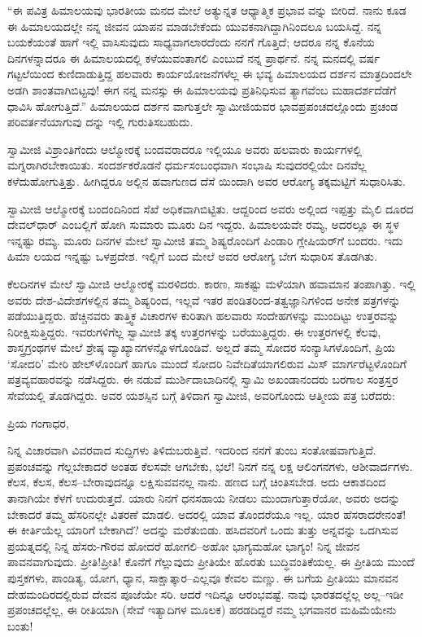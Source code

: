 “ಈ ಪವಿತ್ರ ಹಿಮಾಲಯವು ಭಾರತೀಯ ಮನದ ಮೇಲೆ ಅತ್ಯುನ್ನತ ಆಧ್ಯಾತ್ಮಿಕ ಪ್ರಭಾವ ವನ್ನು ಬೀರಿದೆ. ನಾನು ಕೂಡ ಈ ಹಿಮಾಲಯದಲ್ಲೇ ನನ್ನ ಜೀವನ ಯಾಪನ ಮಾಡಬೇಕೆಂದು ಯುವಕನಾಗಿದ್ದಾಗಿನಿಂದಲೂ ಬಯಸಿದ್ದೆ. ನನ್ನ ಬಯಕೆಯಂತೆ ಹಾಗೆ ಇಲ್ಲಿ ವಾಸಿಸುವುದು ಸಾಧ್ಯವಾಗಲಾರದೆಂದು ನನಗೆ ಗೊತ್ತಿದೆ; ಆದರೂ ನನ್ನ ಕೊನೆಯ ದಿನಗಳನ್ನಾದರೂ ಈ ಹಿಮಾಲಯದಲ್ಲಿ ಕಳೆಯುವಂತಾಗಲಿ ಎಂಬುದೆ ನನ್ನ ಪ್ರಾರ್ಥನೆ. ನನ್ನ ಮನದಲ್ಲಿ ವರ್ಷ ಗಟ್ಟಲೆಯಿಂದ ಕುಣಿದಾಡುತ್ತಿದ್ದ ಹಲವಾರು ಕಾರ್ಯಯೋಜನೆಗಳೆಲ್ಲ ಈ ಭವ್ಯ ಹಿಮಾಲಯದ ದರ್ಶನ ಮಾತ್ರದಿಂದಲೇ ಅಡಗಿ ಶಾಂತವಾಗಿಬಿಟ್ಟವು! ಈಗ ನನ್ನ ಮನಸ್ಸು ಈ ಹಿಮಾಲಯವು ಪ್ರತಿನಿಧಿಸುವ ತ್ಯಾಗವೆಂಬ ಮಹಾದರ್ಶದೆಡೆಗೆ ಧಾವಿಸಿ ಹೋಗುತ್ತಿದೆ.” ಹಿಮಾಲಯದ ದರ್ಶನ ವಾಗುತ್ತಲೇ ಸ್ವಾಮೀಜಿಯವರ ಭಾವಪ್ರಪಂಚದಲ್ಲೊಂದು ಪ್ರಚಂಡ ಪರಿವರ್ತನೆಯಾಗುವು ದನ್ನು ಇಲ್ಲಿ ಗುರುತಿಸಬಹುದು.

ಸ್ವಾಮೀಜಿ ವಿಶ್ರಾಂತಿಗೆಂದು ಆಲ್ಮೋರಕ್ಕೆ ಬಂದವರಾದರೂ ಇಲ್ಲಿಯೂ ಅವರು ಹಲವಾರು ಕಾರ್ಯಗಳಲ್ಲಿ ಮಗ್ನರಾಗಿರಬೇಕಾಯಿತು. ಸಂದರ್ಶಕರೊಡನೆ ಧರ್ಮಸಂಬಂಧವಾಗಿ ಸಂಭಾಷಿ ಸುವುದರಲ್ಲಿಯೇ ದಿನವೆಲ್ಲ ಕಳೆದುಹೋಗುತ್ತಿತ್ತು. ಹೀಗಿದ್ದರೂ ಅಲ್ಲಿನ ಹವಾಗುಣದ ದೆಸೆ ಯಿಂದಾಗಿ ಅವರ ಆರೋಗ್ಯ ತಕ್ಕಮಟ್ಟಿಗೆ ಸುಧಾರಿಸಿತು.

ಸ್ವಾಮೀಜಿ ಆಲ್ಮೋರಕ್ಕೆ ಬಂದಂದಿನಿಂದ ಸೆಖೆ ಅಧಿಕವಾಗಿಬಿಟ್ಟಿತು. ಆದ್ದರಿಂದ ಅವರು ಅಲ್ಲಿಂದ ಇಪ್ಪತ್ತು ಮೈಲಿ ದೂರದ ದೇವಲ್​ಧಾರ್ ಎಂಬಲ್ಲಿಗೆ ಹೋಗಿ ಸುಮಾರು ಮೂರು ದಿನ ಇದ್ದರು. ಹಿಮಾಲಯವೇ ರಮ್ಯ, ಅದರಲ್ಲೂ ಈ ಸ್ಥಳ ಇನ್ನಷ್ಟು ರಮ್ಯ. ಮೂರು ದಿನಗಳ ಮೇಲೆ ಸ್ವಾಮೀಜಿ ತಮ್ಮ ಶಿಷ್ಯರೊಂದಿಗೆ ಪಿಂಡಾರಿ ಗ್ಲೇಷಿಯರ್​ಗೆ ಬಂದರು. ಇದು ಹಿಮಾ ಲಯದ ಇನ್ನಷ್ಟು ಒಳಪ್ರದೇಶ. ಇಲ್ಲಿಗೆ ಬಂದ ಮೇಲೆ ಅವರ ಆರೋಗ್ಯ ಬೇಗ ಸುಧಾರಿಸ ತೊಡಗಿತು.

ಕೆಲದಿನಗಳ ಮೇಲೆ ಸ್ವಾಮೀಜಿ ಆಲ್ಮೋರಕ್ಕೆ ಮರಳಿದರು. ಕಾರಣ, ಸಾಕಷ್ಟು ಮಳೆಯಾಗಿ ಹವಾಮಾನ ತಂಪಾಗಿತ್ತು. ಇಲ್ಲಿ ಅವರು ದೇಶ-ವಿದೇಶಗಳಲ್ಲಿನ ತಮ್ಮ ಶಿಷ್ಯರಿಂದ, ಇಲ್ಲವೆ ಇತರ ಪಂಡಿತರಿಂದ-ತತ್ವಜ್ಞಾನಿಗಳಿಂದ ಅನೇಕ ಪತ್ರಗಳನ್ನು ಪಡೆಯುತ್ತಿದ್ದರು. ಹೆಚ್ಚಿನವರು ತಾತ್ತ್ವಿಕ ವಿಚಾರಗಳ ಕುರಿತಾಗಿ ಹಲವಾರು ಸಂದೇಹಗಳನ್ನು ಮುಂದಿಟ್ಟು ಉತ್ತರವನ್ನು ನಿರೀಕ್ಷಿಸುತ್ತಿದ್ದರು. ಇವರುಗಳಿಗೆಲ್ಲ ಸ್ವಾಮೀಜಿ ತಕ್ಕ ಉತ್ತರಗಳನ್ನು ಬರೆಯುತ್ತಿದ್ದರು. ಈ ಉತ್ತರಗಳಲ್ಲಿ ಕೆಲವು, ಶಾಸ್ತ್ರಗ್ರಂಥಗಳ ಮೇಲೆ ಶ್ರೇಷ್ಠ ವ್ಯಾಖ್ಯಾನಗಳನ್ನೊಳಗೊಂಡಿವೆ. ಅಲ್ಲದೆ ತಮ್ಮ ಸೋದರ ಸಂನ್ಯಾಸಿಗಳೊಂದಿಗೆ, ಪ್ರಿಯ ‘ಸೋದರಿ’ ಮೇರಿ ಹೇಲ್​ಳೊಂದಿಗೆ ಹಾಗೂ ಮುಂದೆ ಸೋದರಿ ನಿವೇದಿತೆಯಾಗಲಿರುವ ಮಿಸ್ ಮಾರ್ಗರೆಟ್ಟಳೊಂದಿಗೆ ಪತ್ರವ್ಯವಹಾರವನ್ನು ನಡೆಸಿದ್ದರು. ಈ ನಡುವೆ ಮುರ್ಶಿದಾಬಾದಿನಲ್ಲಿ ಸ್ವಾಮಿ ಅಖಂಡಾನಂದರು ಬರಗಾಲ ಸಂತ್ರಸ್ತರ ಸೇವೆಯಲ್ಲಿ ತೊಡಗಿದ್ದರು. ಅವರ ಯಶಸ್ಸಿನ ಬಗ್ಗೆ ತಿಳಿದಾಗ ಸ್ವಾಮೀಜಿ, ಅವರಿಗೊಂದು ಆತ್ಮೀಯ ಪತ್ರ ಬರೆದರು:

\noindent

ಪ್ರಿಯ ಗಂಗಾಧರ,

ನಿನ್ನ ವಿಚಾರವಾಗಿ ವಿವರವಾದ ಸುದ್ದಿಗಳು ತಿಳಿದುಬರುತ್ತಿವೆ. ಇದರಿಂದ ನನಗೆ ತುಂಬ ಸಂತೋಷವಾಗುತ್ತಿದೆ. ಪ್ರಪಂಚವನ್ನು ಗೆಲ್ಲಬೇಕಾದರೆ ಅಂತಹ ಕೆಲಸವೇ ಆಗಬೇಕು, ಭಲೆ! ನಿನಗೆ ನನ್ನ ಲಕ್ಷ ಆಲಿಂಗನಗಳು, ಆಶೀವಾರ್ದಗಳು. ಕೆಲಸ, ಕೆಲಸ, ಕೆಲಸ–ಬೇರಾವುದನ್ನೂ ಲಕ್ಷಿಸುವವನಲ್ಲ ನಾನು. ಹಣದ ಬಗ್ಗೆ ಚಿಂತಿಸಬೇಡ. ಅದು ಆಕಾಶದಿಂದ ತಾನಾಗಿಯೇ ಕೆಳಗೆ ಉದುರುತ್ತದೆ. ಯಾರು ನಿನಗೆ ಧನಸಹಾಯ ನೀಡಲು ಮುಂದಾಗುತ್ತಾರೆಯೋ, ಅವರು ಅದನ್ನು ಬೇಕಾದರೆ ತಮ್ಮ ಹೆಸರಿನಲ್ಲೇ ವಿತರಣೆ ಮಾಡಲಿ. ಅದರಲ್ಲಿ ಯಾವ ತೊಂದರೆಯೂ ಇಲ್ಲ. ಯಾರ ಹೆಸರಾದರೇನಂತೆ! ಈ ಕೀರ್ತಿಯೆಲ್ಲ ಯಾರಿಗೆ ಬೇಕಾಗಿದೆ? ಅದನ್ನು ಮರೆತುಬಿಡು. ಹಸಿದವರಿಗೆ ಒಂದು ತುತ್ತು ಅನ್ನವನ್ನು ಒದಗಿಸುವ ಪ್ರಯತ್ನದಲ್ಲಿ ನಿನ್ನ ಹೆಸರು-ಗೌರವ ಹೋದರೆ ಹೋಗಲಿ–ಅಹೋ ಭಾಗ್ಯಮಹೋ ಭಾಗ್ಯಂ! ನಿನ್ನ ಜೀವನ ಪಾವನವಾಗುವುದು. ಪ್ರೀತಿ!ಪ್ರೀತಿ! ಕೊನೆಗೆ ಗೆಲ್ಲುವುದು ಪ್ರೀತಿಯೇ ಹೊರತು ಬುದ್ಧಿವಂತಿಕೆಯಲ್ಲ. ಈ ಪ್ರೀತಿಯ ಮುಂದೆ ಪುಸ್ತಕಗಳು, ಪಾಂಡಿತ್ಯ, ಯೋಗ, ಧ್ಯಾನ, ಸಾಕ್ಷಾತ್ಕಾರ–ಎಲ್ಲವೂ ಕೇವಲ ಮಣ್ಣು. ಈ ಬಗೆಯ ಪ್ರೀತಿಯು ಮಾನವನ ದೇಹಮಂದಿರದಲ್ಲಿರುವ ದೇವನ ಪೂಜೆಯೇ ಸರಿ. ಆದರೆ ಇದಿನ್ನೂ ಆರಂಭವಷ್ಟೆ. ನಾವು ಭಾರತದಲ್ಲೆಲ್ಲ ಅಲ್ಲ–ಇಡೀ ಪ್ರಪಂಚದಲ್ಲೆಲ್ಲ, ಈ ರೀತಿಯಾಗಿ (ಸೇವೆ ಇತ್ಯಾದಿಗಳ ಮೂಲಕ) ಹರಡದಿದ್ದರೆ ನಮ್ಮ ಭಗವಾನರ ಮಹಿಮೆಯೇನು ಬಂತು!

